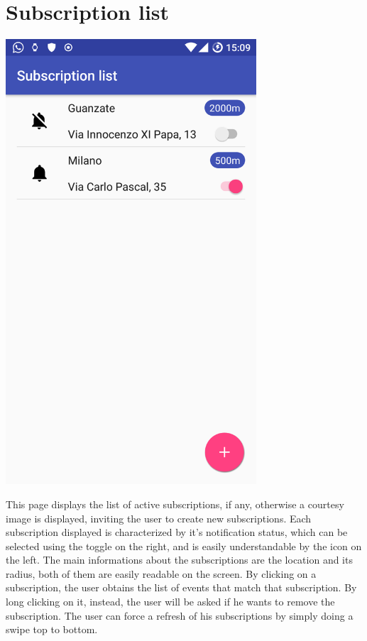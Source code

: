 \documentclass[a4paper]{scrreprt}
\begin{document}
\section{Subscription list}
\begin{minipage}{0.5\textwidth}
	\centering
	\includegraphics[width=0.7\textwidth]{imgs/subscription_list}
\end{minipage}
\begin{minipage}{0.5\textwidth}
	This page displays the list of active subscriptions, if any, otherwise a courtesy image is displayed, inviting the user to create new subscriptions. Each subscription displayed is characterized by it's notification status, which can be selected using the toggle on the right, and is easily understandable by the icon on the left. The main informations about the subscriptions are the location and its radius, both of them are easily readable on the screen. By clicking on a subscription, the user obtains the list of events that match that subscription. By long clicking on it, instead, the user will be asked if he wants to remove the subscription. The user can force a refresh of his subscriptions by simply doing a swipe top to bottom.
\end{minipage}
\end{document}
